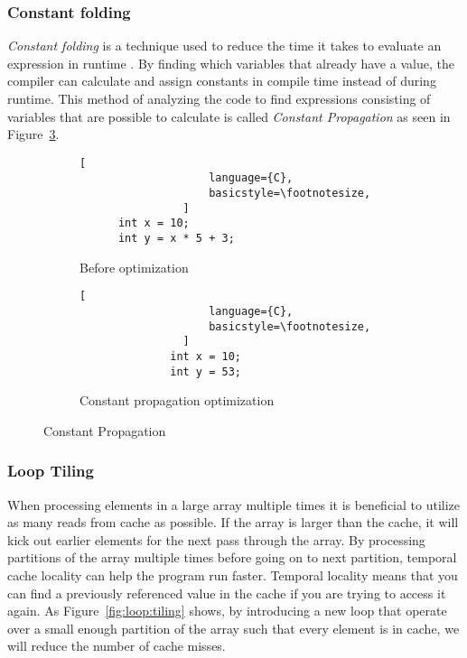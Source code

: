 \subsubsection{Constant folding}
\emph{Constant folding} is a technique used to reduce the time it takes to evaluate an expression in runtime \cite[p.~329]{muchnick1997advanced}. By finding which variables that already have a value, the compiler can calculate and assign constants in compile time instead of during runtime. This method of analyzing the code to find expressions consisting of variables that are possible to calculate is called \emph{Constant Propagation} as seen in Figure~\ref{fig:constant:propagation}.

\begin{figure}[h]
    \centering
    \begin{adjustbox}{minipage=\linewidth,scale=1.0}
        \begin{subfigure}{.40\textwidth}
            \centering
            \begin{lstlisting}[
                    language={C},
                    basicstyle=\footnotesize,
                ]
      int x = 10;
      int y = x * 5 + 3;
                \end{lstlisting}
            \caption{Before optimization}
            \label{fig:propagation:sub1}
        \end{subfigure}%
        \begin{subfigure}{.50\textwidth}
            \centering
            \begin{lstlisting}[
                    language={C},
                    basicstyle=\footnotesize,
                ]
              int x = 10;
              int y = 53;
                \end{lstlisting}
            \caption{Constant propagation optimization}
            \label{fig:propagation:sub2}
        \end{subfigure}
    \end{adjustbox}
    \caption{Constant Propagation}
    \label{fig:constant:propagation}
\end{figure}

\subsubsection{Loop Tiling}
When processing elements in a large array multiple times it is beneficial to utilize as many reads from cache as possible. If the array is larger than the cache, it will kick out earlier elements for the next pass through the array. By processing partitions of the array multiple times before going on to next partition, temporal cache locality can help the program run faster. Temporal locality means that you can find a previously referenced value in the cache if you are trying to access it again. As Figure~\ref{fig:loop:tiling} shows, by introducing a new loop that operate over a small enough partition of the array such that every element is in cache, we will reduce the number of cache misses.

